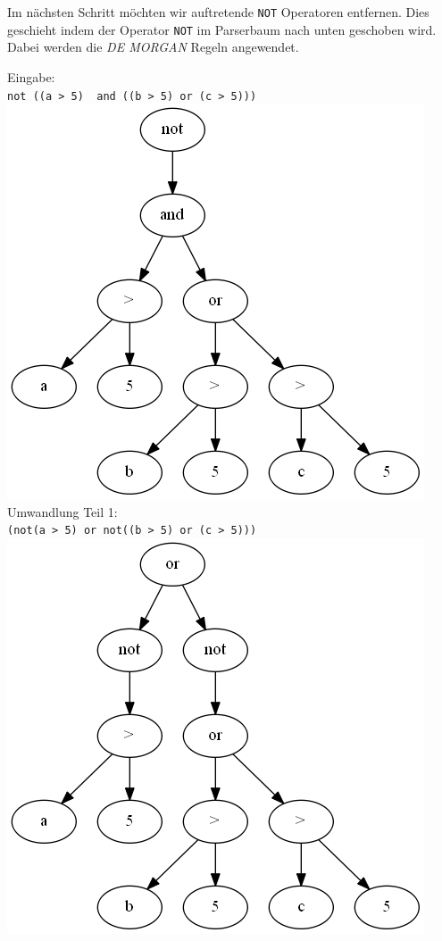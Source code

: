 Im nächsten Schritt möchten wir auftretende \verb|NOT| Operatoren entfernen. Dies geschieht indem der Operator \verb|NOT| im Parserbaum nach unten geschoben wird. Dabei werden die \textit{DE MORGAN} Regeln angewendet. 


Eingabe:\\
\verb|not ((a > 5)  and ((b > 5) or (c > 5)))| \\\includegraphics[scale=0.5]{Bilder/not_graph1.png}\\

Umwandlung Teil 1:\\
\verb|(not(a > 5) or not((b > 5) or (c > 5)))| \\\includegraphics[scale=0.5]{Bilder/not_graph2.png}\\


